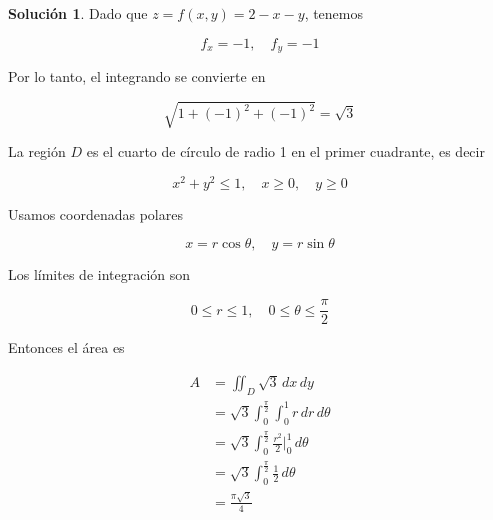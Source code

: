 \documentclass{article}
\theoremstyle{plain}
\theoremstyle{definition}
\newtheorem{sol}[thm]{Solución}
\begin{document}
\begin{sol}Dado que \( z = f(x,y)= 2 - x - y \), tenemos
\end{sol}

\[
f_x = -1, \quad f_y = -1
\]

Por lo tanto, el integrando se convierte en

\[
\sqrt{1 + (-1)^2 + (-1)^2} = \sqrt{3}
\]

La región \( D \) es el cuarto de círculo de radio 1 en el primer cuadrante, es decir

\[
x^2 + y^2 \leq 1, \quad x \geq 0, \quad y \geq 0
\]

Usamos coordenadas polares

\[
x = r \cos \theta, \quad y = r \sin \theta
\]

Los límites de integración son

\[
0 \leq r \leq 1, \quad 0 \leq \theta \leq \frac{\pi}{2}
\]

Entonces el área es

\begin{align*}
    A &=  \iint_D \sqrt{3} \, dx\,dy \\
    &=  \sqrt{3} \int_0^{\frac{\pi}{2}} \int_0^1 r\,dr\,d\theta \\
    &=  \sqrt{3} \int_0^{\frac{\pi}{2}}  \frac{r^2}{2} \bigg|_0^1 \, d\theta \\
    &= \sqrt{3} \int_0^{\frac{\pi}{2}} \frac{1}{2} \, d\theta \\
    &= \frac{\pi \sqrt{3}}{4}
\end{align*}
\end{document}
